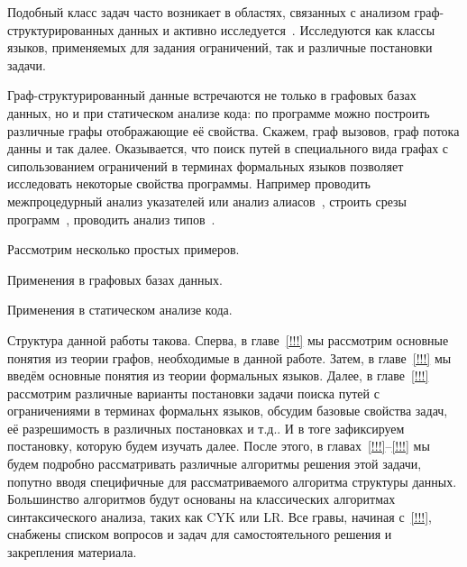 Подобный класс задач часто возникает в областях, связанных с анализом граф-структурированных данных и активно исследуется~\cite{doi:10.1137/S0097539798337716,axelsson2011formal,10.1007/978-3-642-22321-1_24,Ward:2010:CRL:1710158.1710234,barrett2007label,doi:10.1137/S0097539798337716}.
Исследуются как классы языков, применяемых для задания ограничений, так и различные постановки задачи.

Граф-структурированный данные встречаются не только в графовых базах данных, но и при статическом анализе кода: по программе можно построить различные графы отображающие её свойства. Скажем, граф вызовов, граф потока данны и так далее. 
Оказывается, что поиск путей в специального вида графах с сипользованием ограничений в терминах формальных языков позволяет исследовать некоторые свойства программы. Например проводить межпроцедурный анализ указателей или анализ алиасов~\cite{!!!}, строить срезы программ~\cite{!!!}, проводить анализ типов~\cite{!!!}.

Рассмотрим несколько простых примеров.

\begin{example}
Применения в графовых базах данных.
\end{example}

\begin{example}
Применения в статическом анализе кода.
\end{example}

Структура данной работы такова. 
Сперва, в главе~\ref{!!!} мы рассмотрим основные понятия из теории графов, необходимые в данной работе.
Затем, в главе~\ref{!!!} мы введём основные понятия из теории формальных языков.
Далее, в главе~\ref{!!!} рассмотрим различные варианты постановки задачи поиска путей с ограничениями в терминах формальнх языков, обсудим базовые свойства задач, её разрешимость в различных постановках и т.д.. И в тоге зафиксируем постановку, которую будем изучать далее. После этого, в главах~\ref{!!!}--\ref{!!!} мы будем подробно рассматривать различные алгоритмы решения этой задачи, попутно вводя специфичные для рассматриваемого алгоритма структуры данных. Большинство алгоритмов будут основаны на классических алгоритмах синтаксического анализа, таких как CYK или LR.
Все гравы, начиная с~\ref{!!!}, снабжены списком вопросов и задач для самостоятельного решения и закрепления материала.  